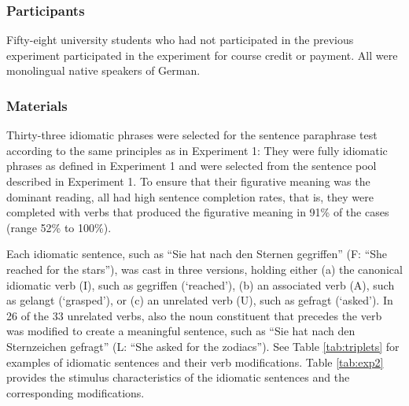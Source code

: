 \documentclass[output=paper]{langsci/langscibook}
\begin{document}
\subsubsection{Participants}
Fifty-eight university students who had not participated in the previous experiment participated in the experiment for course credit or payment. All were monolingual native speakers of German. 

\subsubsection{Materials}
Thirty-three idiomatic phrases were selected for the sentence paraphrase test according to the same principles as in Experiment 1: They were fully idiomatic phrases as defined in Experiment 1 and were selected from the sentence pool described in Experiment 1. To ensure that their figurative meaning was the dominant reading, all had high sentence completion rates, that is, they were completed with verbs that produced the figurative meaning in 91\% of the cases (range 52\% to 100\%).

Each idiomatic sentence, such as “Sie hat nach den Sternen gegriffen” (F: “She reached for the stars”), was cast in three versions, holding either (a) the canonical idiomatic verb (I), such as gegriffen (‘reached’), (b) an associated verb (A), such as gelangt (‘grasped’), or (c) an unrelated verb (U), such as gefragt (‘asked’). In 26 of the 33 unrelated verbs, also the noun constituent that precedes the verb was modified to create a meaningful sentence, such as “Sie hat nach den Sternzeichen gefragt” (L: “She asked for the zodiacs”). See Table \ref{tab:triplets} for examples of idiomatic sentences and their verb modifications.  Table \ref{tab:exp2} provides the stimulus characteristics of the idiomatic sentences and the corresponding modifications.
\end{document}
